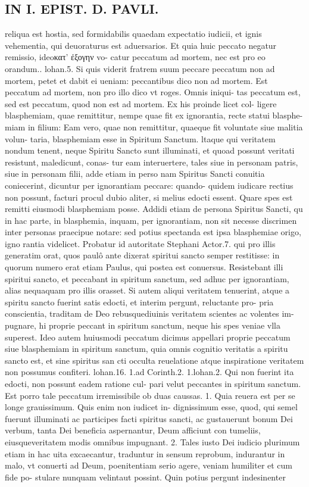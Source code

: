 \documentclass{article}
\begin{document}
\begin{pages}
\section*{IN I. EPIST. D. PAVLI. }
\marginpar{[ p.39 ]}\pstart   reliqua est hostia, sed formidabilis quaedam expectatio iudicii, et ignis vehementia, qui   deuoraturus est aduersarios. Et quia huic peccato negatur remissio, ideoκατ' ἐξογην vo- catur peccatum ad mortem, nec est pro eo orandum.. lohan.5. Si quis viderit fratrem suum peccare peccatum non ad mortem, petet et dabit ei ueniam: peccantibus dico non ad mortem. Est peccatum ad mortem, non pro illo dico vt roges. Omnis iniqui-   tas peccatum est, sed est peccatum, quod non est ad mortem. Ex his proinde licet col-   ligere blasphemiam, quae remittitur, nempe quae fit ex ignorantia, recte statui blasphe-   miam in filium: Eam vero, quae non remittitur, quaeque  fit voluntate siue malitia volun- taria, blasphemiam esse in Spiritum Sanctum. ltaque  qui veritatem nondum tenent, neque  Spiritu Sancto sunt illuminati, et quoad possunt veritati resistunt, maledicunt, conas- tur eam interuertere, tales siue in personam patris, siue in personam filii, adde etiam in perso nam Spiritus Sancti conuitia coniecerint, dicuntur per ignorantiam peccare: quando- quidem iudicare rectius non possunt, facturi procul dubio aliter, si melius edocti essent. Quare spes est remitti eiusmodi blasphemiam posse. Addidi etiam de persona Spiritus Sancti, qu in hac parte, in blasphemia, inquam, per ignorantiam, non sit necesse discrimen inter personas praecipue notare: sed potius spectanda est ipsa blasphemiae origo, igno rantia videlicet. Probatur id autoritate Stephani Actor.7. qui pro illis generatim orat, quos paulô ante dixerat spiritui sancto semper restitisse: in quorum numero erat etiam Paulus, qui postea est conuersus. Resistebant illi spiritui sancto, et peccabant in spiritum sanctum, sed adhuc per ignorantiam, alias nequaquam pro illis orasset. Si autem aliqui veritatem tenuerint, atque  a spiritu sancto fuerint satis edocti, et interim pergunt, reluctante pro- pria conscientia, traditam de Deo rebusquediuinis veritatem scientes ac volentes im- pugnare, hi proprie peccant in spiritum sanctum, neque  his spes veniae vlla superest. Ideo autem huiusmodi peccatum dicimus appellari proprie peccatum siue blasphemiam in spiritum sanctum, quia omnis cognitio veritatis a spiritu sancto est, et sine spiritus san cti occulta reuelatione atque  inspiratione veritatem non possumus confiteri. lohan.16. 1.ad Corinth.2. 1.lohan.2. Qui non fuerint ita edocti, non possunt eadem ratione cul- pari velut peccantes in spiritum sanctum. Est porro tale peccatum irremissibile ob duas caussas. 1. Quia reuera est per se longe grauissimum. Quis enim non iudicet in- dignissimum esse, quod, qui semel fuerunt illuminati ac participes facti spiritus sancti, ac gustauerunt bonum Dei verbum, tanta Dei beneficia aspernantur, Deum afficiunt con tumeliis, eiusqueveritatem modis omnibus impugnant. 2. Tales iusto Dei iudicio plurimum etiam in hac uita excaecantur, traduntur in sensum reprobum, indurantur in malo, vt conuerti ad Deum, poenitentiam serio agere, veniam humiliter et cum fide po- stulare nunquam velintaut possint. Quin potius pergunt indesinenter 
\end{pages}
\end{document}
